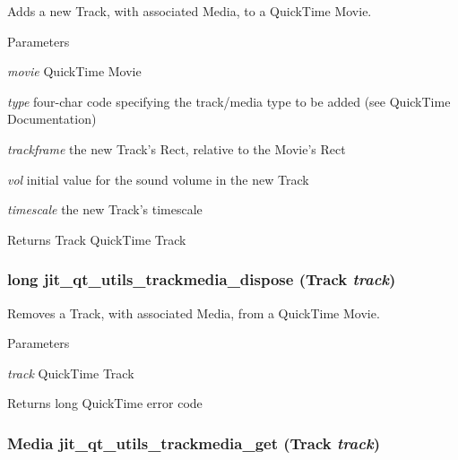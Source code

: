 Adds a new Track, with associated Media, to a QuickTime Movie. 
\begin{DoxyParams}{Parameters}
\item[{\em movie}]QuickTime Movie \item[{\em type}]four-\/char code specifying the track/media type to be added (see QuickTime Documentation) \item[{\em trackframe}]the new Track's Rect, relative to the Movie's Rect \item[{\em vol}]initial value for the sound volume in the new Track \item[{\em timescale}]the new Track's timescale\end{DoxyParams}
\begin{DoxyReturn}{Returns}
Track QuickTime Track 
\end{DoxyReturn}
\hypertarget{group__qtutilsmod_ga26af1223bb5a5a0253635290bad62397}{
\subsubsection[{jit\_\-qt\_\-utils\_\-trackmedia\_\-dispose}]{\setlength{\rightskip}{0pt plus 5cm}long jit\_\-qt\_\-utils\_\-trackmedia\_\-dispose (Track {\em track})}}
\label{group__qtutilsmod_ga26af1223bb5a5a0253635290bad62397}


Removes a Track, with associated Media, from a QuickTime Movie. 
\begin{DoxyParams}{Parameters}
\item[{\em track}]QuickTime Track\end{DoxyParams}
\begin{DoxyReturn}{Returns}
long QuickTime error code 
\end{DoxyReturn}
\hypertarget{group__qtutilsmod_gaf912891dc0afef646d72b349cf4187fa}{
\subsubsection[{jit\_\-qt\_\-utils\_\-trackmedia\_\-get}]{\setlength{\rightskip}{0pt plus 5cm}Media jit\_\-qt\_\-utils\_\-trackmedia\_\-get (Track {\em track})}}
\label{group__qtutilsmod_gaf912891dc0afef646d72b349cf4187fa}


